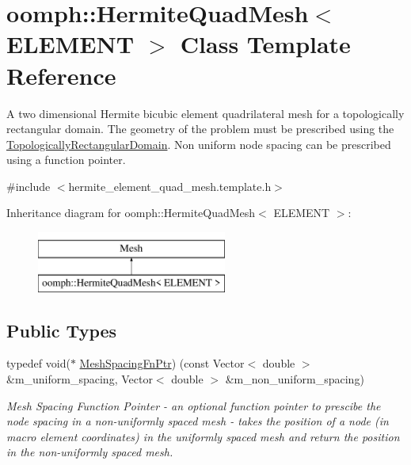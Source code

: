 \hypertarget{classoomph_1_1HermiteQuadMesh}{}\section{oomph\+:\+:Hermite\+Quad\+Mesh$<$ E\+L\+E\+M\+E\+NT $>$ Class Template Reference}
\label{classoomph_1_1HermiteQuadMesh}


A two dimensional Hermite bicubic element quadrilateral mesh for a topologically rectangular domain. The geometry of the problem must be prescribed using the \hyperlink{classoomph_1_1TopologicallyRectangularDomain}{Topologically\+Rectangular\+Domain}. Non uniform node spacing can be prescribed using a function pointer.  




{\ttfamily \#include $<$hermite\+\_\+element\+\_\+quad\+\_\+mesh.\+template.\+h$>$}

Inheritance diagram for oomph\+:\+:Hermite\+Quad\+Mesh$<$ E\+L\+E\+M\+E\+NT $>$\+:\begin{figure}[H]
\begin{center}
\leavevmode
\includegraphics[height=2.000000cm]{classoomph_1_1HermiteQuadMesh}
\end{center}
\end{figure}
\subsection*{Public Types}
\begin{DoxyCompactItemize}
\item 
typedef void($\ast$ \hyperlink{classoomph_1_1HermiteQuadMesh_abebf4806b300591f976398404ed0ef3f}{Mesh\+Spacing\+Fn\+Ptr}) (const Vector$<$ double $>$ \&m\+\_\+uniform\+\_\+spacing, Vector$<$ double $>$ \&m\+\_\+non\+\_\+uniform\+\_\+spacing)
\begin{DoxyCompactList}\small\item\em Mesh Spacing Function Pointer -\/ an optional function pointer to prescibe the node spacing in a non-\/uniformly spaced mesh -\/ takes the position of a node (in macro element coordinates) in the uniformly spaced mesh and return the position in the non-\/uniformly spaced mesh. \end{DoxyCompactList}\end{DoxyCompactItemize}
